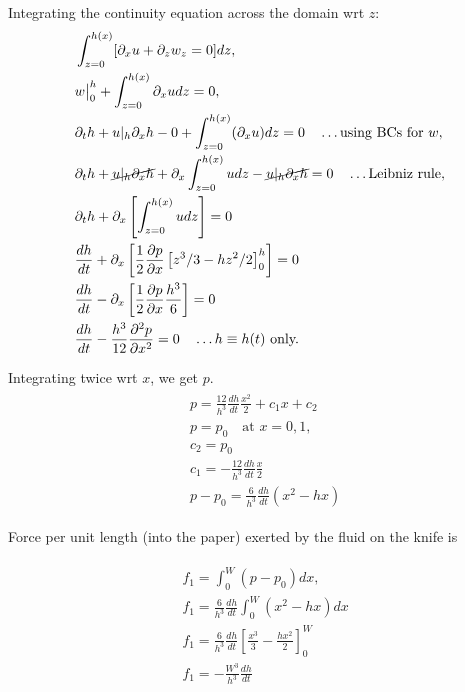\documentclass{article}
\begin{document}
Integrating the continuity equation across the domain wrt $z$:
\begin{align}\label{eq:integrate_conti}
\begin{split}
 &\int_{z=0}^{h(x)} [\partial_{x} u + \partial_{z} w_{z} = 0 ] dz,\\
 & w\big|_{0}^{h} + \int_{z=0}^{h(x)} \partial_{x} u dz = 0,\\
 & \partial_{t}h + u|_{h} \partial_{x}h - 0 +  \int_{z=0}^{h(x)} (\partial_{x} u )dz = 0 \quad \hdots \textrm{using BCs for } w, \\
 & \partial_{t}h + \cancel{u|_{h} \partial_{x}h} + \partial_{x} \int_{z=0}^{h(x)} u dz - \cancel{u|_{h} \partial_{x}h} = 0 \quad \hdots \textrm{Leibniz rule},\\
 & \partial_{t}h + \partial_{x}\left[\int_{z=0}^{h(x)} u dz\right] = 0\\
 &\frac{dh}{dt} + \partial_{x}\left[\frac{1}{2}\frac{\partial p}{\partial x}\left[z^{3}/3-hz^{2}/2 \right]_{0}^{h} \right] = 0\\
 &\frac{dh}{dt} - \partial_{x}\left[\frac{1}{2}\frac{\partial p}{\partial x}\frac{h^{3}}{6} \right] = 0\\
 &\frac{dh}{dt} -\frac{h^{3}}{12}\frac{\partial^{2}p}{\partial x^{2}} = 0 \quad \hdots h \equiv h(t) \textrm{ only.} 
\end{split}
\end{align}

Integrating twice wrt $x$, we get $p$. 
\begin{align}\label{eq:thin_film_p}
 \begin{split}
  & p = \frac{12}{h^{3}}\frac{dh}{dt} \frac{x^{2}}{2} + c_{1}x + c_{2}\\
  & p = p_{0} \quad \textrm{at }x = 0, 1, \\
  & c_{2} = p_{0}\\
  &c_{1} =-\frac{12}{h^{3}}\frac{dh}{dt} \frac{x}{2}\\
  & p - p_{0} = \frac{6}{h^{3}}\frac{dh}{dt}(x^{2}-hx)
 \end{split}
\end{align}

Force per unit length (into the paper) exerted by the fluid on the knife is 

\begin{align}\label{eq:thin_film_force}
 \begin{split}
  & f_{1} = \int_{0}^{W} (p - p_{0}) dx, \\
  & f_{1} = \frac{6}{h^{3}}\frac{dh}{dt} \int_{0}^{W}(x^{2}-hx) dx\\
  & f_{1} = \frac{6}{h^{3}}\frac{dh}{dt} \left[\frac{x^{3}}{3} - \frac{hx^{2}}{2}\right]_{0}^{W}\\
  & f_{1} = -\frac{W^{3}}{h^{3}}\frac{dh}{dt}
 \end{split}
\end{align}
\end{document}
